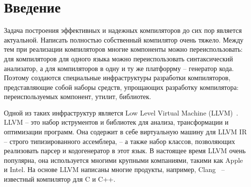 \documentclass[14pt]{extarticle}
\renewcommand\baselinestretch{1.5}
\begin{document}

\tableofcontents
\thispagestyle{empty} 
\pagebreak
\section*{Введение}
Задача построения эффективных и надежных компиляторов до сих пор является актуальной. Написать полностью собственный компилятор очень тяжело. Между тем при реализации компиляторов многие компоненты можно переиспользовать: для компиляторов для одного языка можно переиспользовать синтаксический анализатор, а для компиляторов в одну и ту же платфоррму -- генератор кода. Поэтому создаются специальные инфраструктуры разработки компиляторов, представляющие собой наборы средств, упрощающих разработку компилятора: переиспользуемых компонент, утилит, библиотек.

Одной из таких инфраструктур является Low Level Virtual Machine (LLVM)~\cite{llvm}. LLVM -- это набор иструментов и библиотек для анализа, трансформации и оптимизации программ. Она содержит в себе виртуальную машину для LLVM IR -- строго типизированного ассемблера, -- а также набор классов, позволяющих реализовать парсер и кодогенератор в этот язык. В настоящее время LLVM очень популярна, она используется многими крупными компаниями, такими как Apple и Intel. На основе LLVM написаны многие продукты, например, Clang~\cite{clang} -- известный компилятор для C и C++.
\end{document}
